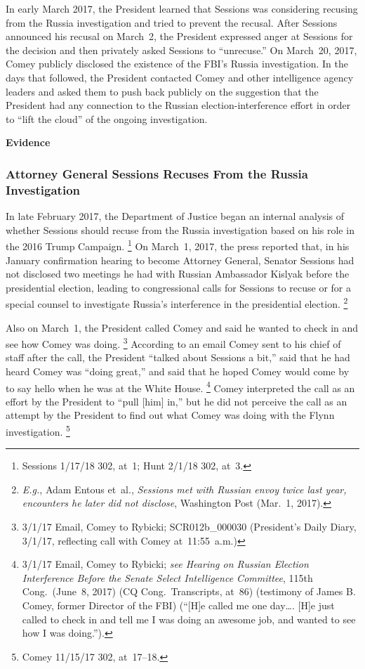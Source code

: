 In early March 2017, the President learned that Sessions was considering recusing from the Russia investigation and tried to prevent the recusal.
After Sessions announced his recusal on March~2, the President expressed anger at Sessions for the decision and then privately asked Sessions to ``unrecuse.''
On March~20, 2017, Comey publicly disclosed the existence of the FBI's Russia investigation.
In the days that followed, the President contacted Comey and other intelligence agency leaders and asked them to push back publicly on the suggestion that the President had any connection to the Russian election-interference effort in order to ``lift the cloud'' of the ongoing investigation.

\begin{center}
\textbf{Evidence}
\end{center}

\subsubsection{Attorney General Sessions Recuses From the Russia Investigation}

In late February 2017, the Department of Justice began an internal analysis of whether Sessions should recuse from the Russia investigation based on his role in the 2016 Trump Campaign.%
\footnote{Sessions 1/17/18 302, at~1;
Hunt 2/1/18 302, at~3.}
On March~1, 2017, the press reported that, in his January confirmation hearing to become Attorney General, Senator Sessions had not disclosed two meetings he had with Russian Ambassador Kislyak before the presidential election, leading to congressional calls for Sessions to recuse or for a special counsel to investigate Russia's interference in the presidential election.%
\footnote{\textit{E.g.}, Adam Entous et~al., \textit{Sessions met with Russian envoy twice last year, encounters he later did not disclose}, Washington Post (Mar.~1, 2017).}

Also on March~1, the President called Comey and said he wanted to check in and see how Comey was doing.%
\footnote{3/1/17 Email, Comey to Rybicki;
SCR012b\_000030 (President's Daily Diary, 3/1/17, reflecting call with Comey at~11:55~a.m.)}
According to an email Comey sent to his chief of staff after the call, the President ``talked about Sessions a bit,'' said that he had heard Comey was ``doing great,'' and said that he hoped Comey would come by to say hello when he was at the White House.%
\footnote{3/1/17 Email, Comey to Rybicki;
\textit{see Hearing on Russian Election Interference Before the Senate Select Intelligence Committee}, 115th Cong.\ (June~8, 2017) (CQ Cong.\ Transcripts, at~86) (testimony of James B. Comey, former Director of the FBI) (``[H]e called me one day\dots. [H]e just called to check in and tell me I was doing an awesome job, and wanted to see how I was doing.'').}
Comey interpreted the call as an effort by the President to ``pull [him] in,'' but he did not perceive the call as an attempt by the President to find out what Comey was doing with the Flynn investigation.%
\footnote{Comey 11/15/17 302, at~17--18.}

